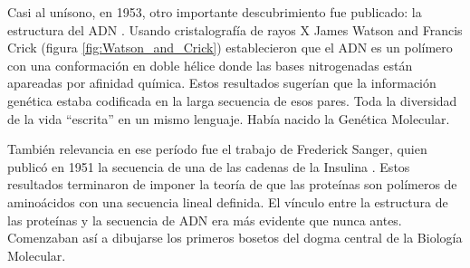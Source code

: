 Casi al unísono, en 1953, otro importante descubrimiento fue publicado: la estructura del ADN \cite{watsonMolecularStructureNucleic1953}.
Usando cristalografía de rayos X James Watson and Francis Crick (figura \ref{fig:Watson_and_Crick}) establecieron que el ADN es un polímero con una conformación en doble hélice donde las bases nitrogenadas están apareadas por afinidad química.
Estos resultados sugerían que la información genética estaba codificada en la larga secuencia de esos pares.
Toda la diversidad de la vida ``escrita'' en un mismo lenguaje.
Había nacido la Genética Molecular.

También relevancia en ese período fue el trabajo de Frederick Sanger, quien publicó en 1951 la secuencia de una de las cadenas de la Insulina \cite{sangerAminoacidSequencePhenylalanyl1951}.
Estos resultados terminaron de imponer la teoría de que las proteínas son polímeros de aminoácidos con una secuencia lineal definida.
El vínculo entre la estructura de las proteínas y la secuencia de ADN era más evidente que nunca antes.
Comenzaban así a dibujarse los primeros bosetos del dogma central de la Biología Molecular.
